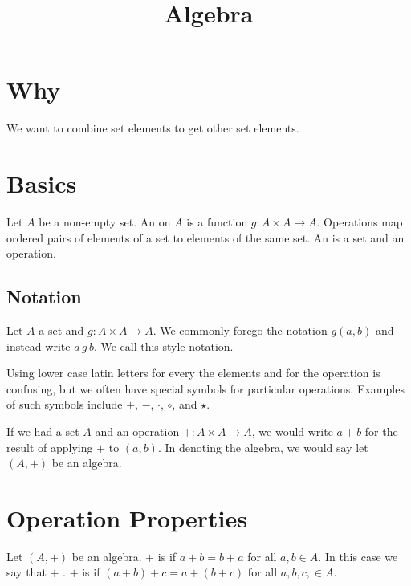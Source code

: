 






\title{Algebra}

\section{Why}

We want to combine set elements to get other set elements.

\section{Basics}


Let $A$ be a non-empty set.
An  on $A$ is a function $g: A \times A \to A$.
Operations map ordered pairs of elements of a set to elements of the same set.
An  is a set and an operation.


\subsection{Notation}

Let $A$ a set and $g: A \times A \to A$.
We commonly forego the notation $g(a, b)$ and instead write $a\,g\,b$.
We call this style  notation.

Using lower case latin letters for every the elements and for the operation is confusing, but we often have special symbols for particular operations.
Examples of such symbols include $+$, $-$, $\cdot$, $\circ$, and $\star$.

If we had a set $A$ and an operation $+: A \times A \to A$, we would write $a+b$ for the result of applying $+$ to $(a,b)$.
In denoting the algebra, we would say let $(A, +)$ be an algebra.

\section{Operation Properties}

Let $(A, +)$ be an algebra.
$+$ is  if $a + b = b + a$ for all $a, b \in A$.
In this case we say that $+$ .
$+$ is  if $(a + b) + c = a + (b + c)$ for all $a, b, c, \in A$.



